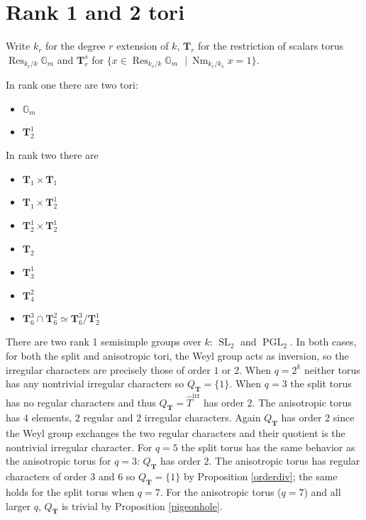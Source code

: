 \documentclass[11pt]{amsart}
\theoremstyle{plain}
\theoremstyle{definition}
\DeclareMathOperator{\Nm}{Nm}
\DeclareMathOperator{\Res}{Res}
\DeclareMathOperator{\PGL}{PGL}
\DeclareMathOperator{\SL}{SL}
\newcommand{\st}{\ensuremath{\ \ \ \vert\ }}
\newcommand{\Gm}{\mathbb{G}_m}
\newcommand{\T}{\mathbf{T}}
\newcommand{\hatT}{\hat{T}}
\newcommand{\Thirr}{\hatT^{\operatorname{irr}}}
\begin{document}
\section{Rank 1 and 2 tori}

Write $k_r$ for the degree $r$ extension of $k$, $\T_r$ for the restriction of scalars torus $\Res_{k_r/k} \Gm$ and $\T_r^s$ for $\{x \in \Res_{k_r/k} \Gm \st \Nm_{k_r/k_s} x = 1\}$.

In rank one there are two tori:
\begin{itemize}
\item $\Gm$
\item $\T_2^1$
\end{itemize}

In rank two there are 
\begin{itemize}
\item $\T_1 \times \T_1$
\item $\T_1 \times \T_2^1$
\item $\T_2^1 \times \T_2^1$
\item $\T_2$
\item $\T_3^1$
\item $\T_4^2$
\item $\T_6^3 \cap \T_6^2 \simeq \T_6^3 / \T_2^1$
\end{itemize}

There are two rank 1 semisimple groups over $k$: $\SL_2$ and $\PGL_2$.  In both cases, for both the split and anisotropic tori, the Weyl group acts as inversion, so the irregular characters are precisely those of order $1$ or $2$.  When $q = 2^k$ neither torus has any nontrivial irregular characters so $Q_{\T} = \{1\}$.  When $q = 3$ the split torus has no regular characters and thus $Q_{\T} = \Thirr$ has order $2$.  The anisotropic torus has $4$ elements, $2$ regular and $2$ irregular characters.  Again $Q_{\T}$ has order $2$ since the Weyl group exchanges the two regular characters and their quotient is the nontrivial irregular character.  For $q = 5$ the split torus has the same behavior as the anisotropic torus for $q = 3$: $Q_{\T}$ has order $2$.  The anisotropic torus has regular characters of order $3$ and $6$ so $Q_{\T} = \{1\}$ by Proposition \ref{orderdiv}; the same holds for the split torus when $q = 7$.  For the anisotropic torus ($q = 7$) and all larger $q$, $Q_{\T}$ is trivial by Proposition \ref{pigeonhole}.
\end{document}
